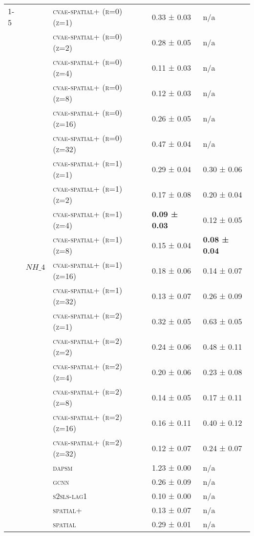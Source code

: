 \documentclass{article}
\begin{document}
\begin{table}[!tbp]
\begin{tabular}{lllll}
\cline{1-5} \cline{2-5}
\multirow[t]{46}{*}{$ (LC)\; SO\_{4} \;\to\; PM\_{2.5}\; (r=2) $} & \multirow[t]{23}{*}{$ NH\_{4} $} & \textsc{cvae-spatial+ (r=0) (z=1)} & 0.33 ± { 0.03} & n/a \\
 &  & \textsc{cvae-spatial+ (r=0) (z=2)} & 0.28 ± { 0.05} & n/a \\
 &  & \textsc{cvae-spatial+ (r=0) (z=4)} & 0.11 ± { 0.03} & n/a \\
 &  & \textsc{cvae-spatial+ (r=0) (z=8)} & 0.12 ± { 0.03} & n/a \\
 &  & \textsc{cvae-spatial+ (r=0) (z=16)} & 0.26 ± { 0.05} & n/a \\
 &  & \textsc{cvae-spatial+ (r=0) (z=32)} & 0.47 ± { 0.04} & n/a \\
 &  & \textsc{cvae-spatial+ (r=1) (z=1)} & 0.29 ± { 0.04} & 0.30 ± { 0.06} \\
 &  & \textsc{cvae-spatial+ (r=1) (z=2)} & 0.17 ± { 0.08} & 0.20 ± { 0.04} \\
 &  & \textsc{cvae-spatial+ (r=1) (z=4)} & \bf 0.09 ± { 0.03} & 0.12 ± { 0.05} \\
 &  & \textsc{cvae-spatial+ (r=1) (z=8)} & 0.15 ± { 0.04} & \bf 0.08 ± { 0.04} \\
 &  & \textsc{cvae-spatial+ (r=1) (z=16)} & 0.18 ± { 0.06} & 0.14 ± { 0.07} \\
 &  & \textsc{cvae-spatial+ (r=1) (z=32)} & 0.13 ± { 0.07} & 0.26 ± { 0.09} \\
 &  & \textsc{cvae-spatial+ (r=2) (z=1)} & 0.32 ± { 0.05} & 0.63 ± { 0.05} \\
 &  & \textsc{cvae-spatial+ (r=2) (z=2)} & 0.24 ± { 0.06} & 0.48 ± { 0.11} \\
 &  & \textsc{cvae-spatial+ (r=2) (z=4)} & 0.20 ± { 0.06} & 0.23 ± { 0.08} \\
 &  & \textsc{cvae-spatial+ (r=2) (z=8)} & 0.14 ± { 0.05} & 0.17 ± { 0.11} \\
 &  & \textsc{cvae-spatial+ (r=2) (z=16)} & 0.16 ± { 0.11} & 0.40 ± { 0.12} \\
 &  & \textsc{cvae-spatial+ (r=2) (z=32)} & 0.12 ± { 0.07} & 0.24 ± { 0.07} \\
 &  & \textsc{dapsm} & 1.23 ± { 0.00} & n/a \\
 &  & \textsc{gcnn} & 0.26 ± { 0.09} & n/a \\
 &  & \textsc{s2sls-lag1} & 0.10 ± { 0.00} & n/a \\
 &  & \textsc{spatial+} & 0.13 ± { 0.07} & n/a \\
 &  & \textsc{spatial} & 0.29 ± { 0.01} & n/a \\

\end{tabular}
\end{table}
\end{document}
